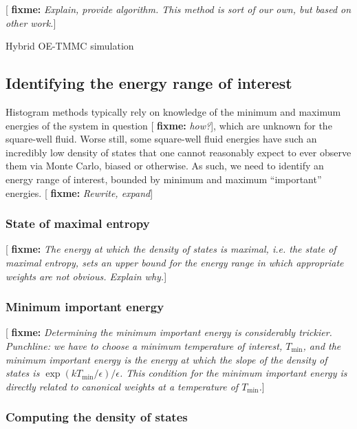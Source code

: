 \documentclass[11pt]{article}
\renewcommand{\t}{\text} %
\newcommand{\p}[1]{\left(#1\right)} %
\newcommand{\red}[1]{{\bf \color{red} #1}}
\newcommand{\fixme}[1]{[\red{fixme:} \emph{#1}]}
\begin{document}
\fixme{Explain, provide algorithm. This method is sort of our own, but
  based on other work.}

\begin{algorithm}[H]
  \caption{Hybrid OE-TMMC simulation}
  \label{alg:oetmmc}
\end{algorithm}


\subsection{Identifying the energy range of interest}
\label{sec:energy_range}

Histogram methods typically rely on knowledge of the minimum and
maximum energies of the system in question \fixme{how?}, which are
unknown for the square-well fluid. Worse still, some square-well fluid
energies have such an incredibly low density of states that one cannot
reasonably expect to ever observe them via Monte Carlo, biased or
otherwise. As such, we need to identify an energy range of interest,
bounded by minimum and maximum ``important'' energies. \fixme{Rewrite,
  expand}

\subsubsection{State of maximal entropy}
\label{sec:max_entropy}

\fixme{The energy at which the density of states is maximal, i.e. the
  state of maximal entropy, sets an upper bound for the energy range
  in which appropriate weights are not obvious. Explain why.}

\subsubsection{Minimum important energy}
\label{sec:min_energy}

\fixme{Determining the minimum important energy is considerably
  trickier. Punchline: we have to choose a minimum temperature of
  interest, $T_{\t{min}}$, and the minimum important energy is the
  energy at which the slope of the density of states is
  $\exp\p{kT_{\t{min}}/\epsilon}/\epsilon$. This condition for the
  minimum important energy is directly related to canonical weights at
  a temperature of $T_{\t{min}}$.}

\subsubsection{Computing the density of states}
\label{sec:dos}
\end{document}

